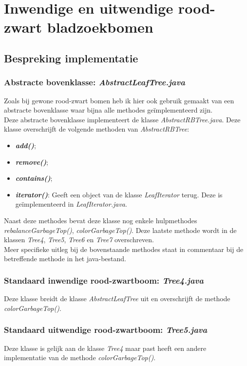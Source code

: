 \documentclass[11pt,a4paper]{report}
\begin{document}
\section{Inwendige en uitwendige rood-zwart bladzoekbomen}
\subsection{Bespreking implementatie}
\subsubsection*{Abstracte bovenklasse: \textsl{AbstractLeafTree.java}}
Zoals bij gewone rood-zwart bomen heb ik hier ook gebruik gemaakt van een abstracte bovenklasse waar bijna alle methodes ge\"implementeerd zijn.\\
Deze abstracte bovenklasse implementeert de klasse \textsl{AbstractRBTree.java}. Deze klasse overschrijft de volgende methoden van \textsl{AbstractRBTree}:
\begin{itemize}
\item \textsl{\textbf{add()}};
\item \textsl{\textbf{remove()}};
\item \textsl{\textbf{contains()}};
\item \textsl{\textbf{iterator()}}: Geeft een object van de klasse \textsl{LeafIterator} terug. Deze is ge\"implementeerd in \textsl{LeafIterator.java}.
\end{itemize}
Naast deze methodes bevat deze klasse nog enkele hulpmethodes \textsl{rebalanceGarbageTop()}, \textsl{colorGarbageTop()}. Deze laatste methode wordt in de klassen \textsl{Tree4}, \textsl{Tree5}, \textsl{Tree6} en \textsl{Tree7} overschreven. \\
Meer specifieke uitleg bij de bovenstaande methodes staat in commentaar bij de betreffende methode in het java-bestand.
\subsubsection*{Standaard inwendige rood-zwartboom: \textsl{Tree4.java}}
Deze klasse breidt de klasse \textsl{AbstractLeafTree} uit en overschrijft de methode \textsl{colorGarbageTop()}.
\subsubsection*{Standaard uitwendige rood-zwartboom: \textsl{Tree5.java}}
Deze klasse is gelijk aan de klasse \textsl{Tree4} maar past heeft een andere implementatie van de methode \textsl{colorGarbageTop()}.
\end{document}
